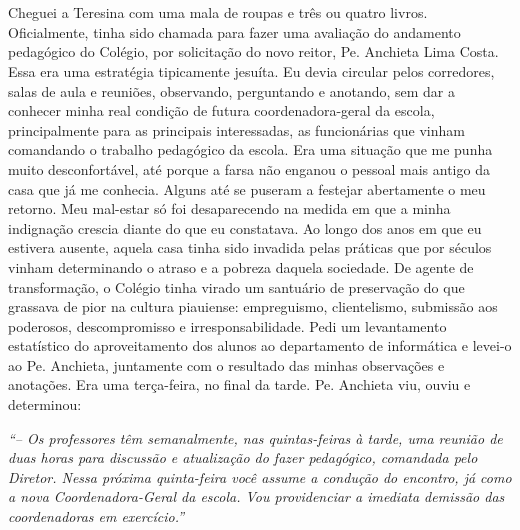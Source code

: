 \chapter{}

Cheguei a Teresina com uma mala de roupas e três ou quatro livros.
Oficialmente, tinha sido chamada para fazer uma avaliação do andamento pedagógico do Colégio, por solicitação do novo reitor, Pe. Anchieta Lima Costa.
Essa era uma estratégia tipicamente jesuíta.
Eu devia circular pelos corredores, salas de aula e reuniões, observando, perguntando e anotando, sem dar a conhecer minha real condição de futura coordenadora-geral da escola, principalmente para as principais interessadas, as funcionárias que vinham comandando o trabalho pedagógico da escola.
Era uma situação que me punha muito desconfortável, até porque a farsa não enganou o pessoal mais antigo da casa que já me conhecia.
Alguns até se puseram a festejar abertamente o meu retorno.
Meu mal-estar só foi desaparecendo na medida em que a minha indignação crescia diante do que eu constatava.
Ao longo dos anos em que eu estivera ausente, aquela casa tinha sido invadida pelas práticas que por séculos vinham determinando o atraso e a pobreza daquela sociedade.
De agente de transformação, o Colégio tinha virado um santuário de preservação do que grassava de pior na cultura piauiense: empreguismo, clientelismo, submissão aos poderosos, descompromisso e irresponsabilidade.
Pedi um levantamento estatístico do aproveitamento dos alunos ao departamento de informática e levei-o ao Pe. Anchieta, juntamente com o resultado das minhas observações e anotações.
Era uma terça-feira, no final da tarde.
Pe. Anchieta viu, ouviu e determinou:

\textit{``-- Os professores têm semanalmente, nas quintas-feiras à tarde, uma reunião de duas horas para discussão e atualização do fazer pedagógico, comandada pelo Diretor.
Nessa próxima quinta-feira você assume a condução do encontro, já como a nova Coordenadora-Geral da escola.
Vou providenciar a imediata demissão das coordenadoras em exercício.''}

